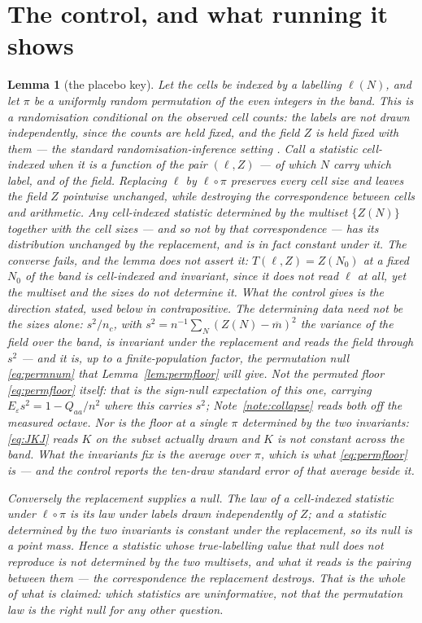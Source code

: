 \documentclass[11pt,a4paper]{article}
\theoremstyle{plain}
\newtheorem{lemma}[theorem]{Lemma}
\theoremstyle{definition}
\theoremstyle{remark}
\begin{document}
\section{The control, and what running it shows}\label{sec:placebo}

\begin{lemma}[the placebo key]\label{lem:placebo}
Let the cells be indexed by a labelling $\ell(N)$, and let $\pi$ be a
uniformly random permutation of the even integers in the band. This is
a randomisation \emph{conditional on the observed cell counts}: the
labels are not drawn independently, since the counts are held fixed,
and the field $Z$ is held fixed with them --- the standard
randomisation-inference setting \cite{LR}. Call a
statistic \emph{cell-indexed} when it is a function of the pair
$(\ell,Z)$ --- of which $N$ carry which label, and of the field.
Replacing $\ell$ by
$\ell\circ\pi$ preserves every cell size and leaves the field $Z$
pointwise unchanged, while destroying the correspondence between cells
and arithmetic. Any cell-indexed statistic determined by the multiset
$\{Z(N)\}$ together with the cell sizes --- and so not by that
correspondence --- has its distribution unchanged by the replacement,
and is in fact constant under it. The converse fails, and the lemma
does not assert it: $T(\ell,Z)=Z(N_0)$ at a fixed $N_0$ of the band is
cell-indexed and invariant, since it does not read $\ell$ at all, yet
the multiset and the sizes do not determine it. What the control gives
is the direction stated, used below in contrapositive.
The determining data need not be the sizes alone:
$s^2/n_c$, with $s^2=n^{-1}\sum_N(Z(N)-\overline m)^2$ the variance of
the field over the band, is invariant under the replacement and reads
the field through $s^2$ --- and it is, up to a finite-population
factor, the permutation null \eqref{eq:permnum} that
Lemma~\ref{lem:permfloor} will give. Not the permuted floor
\eqref{eq:permfloor} itself: that is the sign-null expectation of this
one, carrying $E_\varepsilon s^2=1-Q_{aa}/n^2$ where this carries
$s^2$; Note~\ref{note:collapse} reads both off the measured octave. Nor
is the floor at a single $\pi$ determined by the two invariants:
\eqref{eq:JKJ} reads $K$ on the subset actually drawn and $K$ is not
constant across the band. What the invariants fix is the average over
$\pi$, which is what \eqref{eq:permfloor} is --- and the control
reports the ten-draw standard error of that average beside it.

Conversely the replacement supplies a null. The law of a cell-indexed
statistic under $\ell\circ\pi$ is its law under labels drawn
independently of $Z$; and a statistic determined by the two
invariants is constant under the replacement, so its null is a point
mass. Hence a statistic whose true-labelling value that null does not
reproduce is not determined by the two multisets, and what it reads is
the pairing between them --- the correspondence the replacement
destroys. That is the whole of what is claimed: which statistics are
uninformative, not that the permutation law is the right null for any
other question.
\end{lemma}
\end{document}
